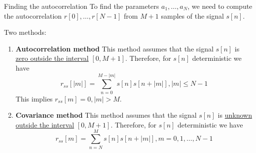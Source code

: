 \begin{frame}{Finding the autocorrelation}
To find the parameters $a_1, \ldots, a_N$, we need to compute the autocorrelation $r[0], \ldots, r[N-1]$ from $M+1$ samples of the signal $s[n]$.

Two methods:
\begin{enumerate}
	\item \textbf{Autocorrelation method}
	This method assumes that the signal $s[n]$ is \underline{zero outside the interval} $[0, M+1]$. Therefore, for $s[n]$ deterministic we have
	\begin{equation*}
	r_{ss}[|m|] = \sum_{n =0}^{M-|m|}s[n]s[n+|m|], |m| \leq N-1
	\end{equation*}
	This implies $r_{ss}[m] = 0, |m| > M$.
	\item \textbf{Covariance method}
	This method assumes that the signal $s[n]$ is \underline{unknown outside the interval} $[0, M+1]$. Therefore, for $s[n]$ deterministic we have
	\begin{equation*}
	r_{ss}[m] = \sum_{n = N}^{M}s[n]s[n+|m|], m = 0, 1, \ldots, N-1
	\end{equation*}	
\end{enumerate}
\end{frame}

